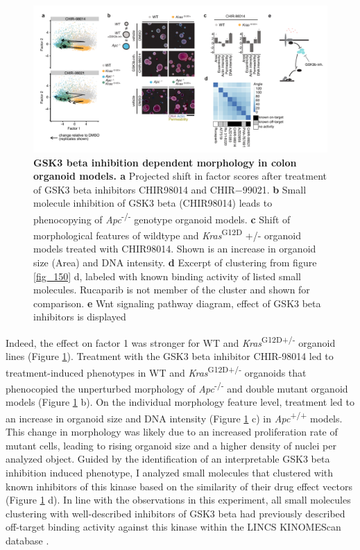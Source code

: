 \begin{flushleft}
\begin{figure}[h]
\centering
\includegraphics[scale=0.75,
                keepaspectratio]{figures/adenomaprofiling/pdf/fig_2_4_1.pdf}
\caption[GSK3 beta inhibition dependent morphology in colon organoid models]{\textbf{GSK3 beta inhibition dependent morphology in colon organoid models. a} Projected shift in factor scores after treatment of GSK3 beta inhibitors CHIR98014 and CHIR−99021. \textbf{b} Small molecule inhibition of GSK3 beta (CHIR98014) leads to phenocopying of \textit{Apc}\textsuperscript{-/-}  genotype organoid models. \textbf{c} Shift of morphological features of wildtype and \textit{Kras}\textsuperscript{G12D} +/- organoid models treated with CHIR98014. Shown is an increase in organoid size (Area) and DNA intensity. \textbf{d} Excerpt of clustering from figure \ref{fig_150} d, labeled with known binding activity of listed small molecules. Rucaparib is not member of the cluster and shown for comparison. \textbf{e} Wnt signaling pathway diagram, effect of GSK3 beta inhibitors is displayed}
\label{fig_185}
\end{figure}
\bigbreak

Indeed, the effect on factor 1 was stronger for WT and \textit{Kras}\textsuperscript{G12D+/-} organoid lines (Figure \ref{fig_185}). Treatment with the GSK3 beta inhibitor CHIR-98014 led to treatment-induced phenotypes in WT and \textit{Kras}\textsuperscript{G12D+/-} organoids that phenocopied the unperturbed morphology of \textit{Apc}\textsuperscript{-/-}  and double mutant organoid models (Figure \ref{fig_185} b). On the individual morphology feature level, treatment led to an increase in organoid size and DNA intensity (Figure \ref{fig_185} c) in \textit{Apc}\textsuperscript{+/+} models. This change in morphology was likely due to an increased proliferation rate of mutant cells, leading to rising organoid size and a higher density of nuclei per analyzed object. Guided by the identification of an interpretable GSK3 beta inhibition induced phenotype, I analyzed small molecules that clustered with known inhibitors of this kinase based on the similarity of their drug effect vectors (Figure \ref{fig_185} d). In line with the observations in this experiment, all small molecules clustering with well-described inhibitors of GSK3 beta had previously described off-target binding activity against this kinase within the LINCS KINOMEScan database \citep{subramanianNextGenerationConnectivity2017}. 
\par 


\end{flushleft}
